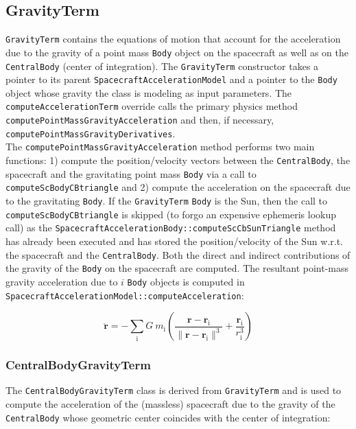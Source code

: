 \subsection{GravityTerm}
\label{sec:GravityTerm}
\texttt{GravityTerm} contains the equations of motion that account for the acceleration due to the gravity of a point mass \texttt{Body} object on the spacecraft as well as on the \texttt{CentralBody} (center of integration). The \texttt{GravityTerm} constructor takes a pointer to its parent \texttt{SpacecraftAccelerationModel} and a pointer to the \texttt{Body} object whose gravity the class is modeling as input parameters.
The \texttt{computeAccelerationTerm} override calls the primary physics method \texttt{computePointMassGravityAcceleration} and then, if necessary, \texttt{computePointMassGravityDerivatives}. \\

The \texttt{computePointMassGravityAcceleration} method performs two main functions: 1) compute the position/velocity vectors between the \texttt{CentralBody}, the spacecraft and the gravitating point mass \texttt{Body} via a call to \texttt{computeScBodyCBtriangle} and 2) compute the acceleration on the spacecraft due to the gravitating \texttt{Body}. If the \texttt{GravityTerm} \texttt{Body} is the Sun, then the call to \texttt{computeScBodyCBtriangle} is skipped (to forgo an expensive ephemeris lookup call) as the \texttt{SpacecraftAccelerationBody::computeScCbSunTriangle} method has already been executed and has stored the position/velocity of the Sun w.r.t. the spacecraft and the \texttt{CentralBody}. Both the direct and indirect contributions of the gravity of the \texttt{Body} on the spacecraft are computed. The resultant point-mass gravity acceleration due to $i$ \texttt{Body} objects is computed in \texttt{SpacecraftAccelerationModel::computeAcceleration}:

\begin{equation}
\ddot{\mathbf{r}} = - \sum_{\text{i}} G~m_{\text{i}} \left( \frac{\mathbf{r} - \mathbf{r}_{\text{i}}}{\|\mathbf{r} - \mathbf{r}_{\text{i}}\|^3} + \frac{\mathbf{r}_{\text{i}}}{r_{\text{i}}^3} \right) \label{eq:EOM_point_mass_gravity} 
\end{equation}

\subsubsection{CentralBodyGravityTerm}
\label{sec:CentralBodyGravityTerm}

The \texttt{CentralBodyGravityTerm} class is derived from \texttt{GravityTerm} and is used to compute the acceleration of the (massless) spacecraft due to the gravity of the \texttt{CentralBody} whose geometric center coincides with the center of integration:

